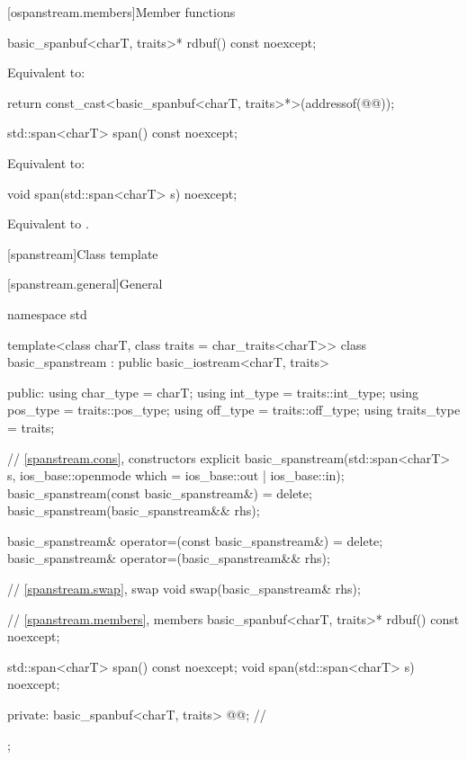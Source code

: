 [ospanstream.members]{Member functions}

%
\begin{itemdecl}
basic_spanbuf<charT, traits>* rdbuf() const noexcept;
\end{itemdecl}

\begin{itemdescr}
\pnum
\effects
Equivalent to:
\begin{codeblock}
return const_cast<basic_spanbuf<charT, traits>*>(addressof(@@));
\end{codeblock}
\end{itemdescr}

%
\begin{itemdecl}
std::span<charT> span() const noexcept;
\end{itemdecl}

\begin{itemdescr}
\pnum
\effects
Equivalent to: 
\end{itemdescr}

%
\begin{itemdecl}
void span(std::span<charT> s) noexcept;
\end{itemdecl}

\begin{itemdescr}
\pnum
\effects
Equivalent to .
\end{itemdescr}

[spanstream]{Class template }

[spanstream.general]{General}

%
\begin{codeblock}
namespace std {
  template<class charT, class traits = char_traits<charT>>
  class basic_spanstream
    : public basic_iostream<charT, traits> {
  public:
    using char_type   = charT;
    using int_type    = traits::int_type;
    using pos_type    = traits::pos_type;
    using off_type    = traits::off_type;
    using traits_type = traits;

    // \ref{spanstream.cons}, constructors
    explicit basic_spanstream(std::span<charT> s,
                              ios_base::openmode which = ios_base::out | ios_base::in);
    basic_spanstream(const basic_spanstream&) = delete;
    basic_spanstream(basic_spanstream&& rhs);

    basic_spanstream& operator=(const basic_spanstream&) = delete;
    basic_spanstream& operator=(basic_spanstream&& rhs);

    // \ref{spanstream.swap}, swap
    void swap(basic_spanstream& rhs);

    // \ref{spanstream.members}, members
    basic_spanbuf<charT, traits>* rdbuf() const noexcept;

    std::span<charT> span() const noexcept;
    void span(std::span<charT> s) noexcept;

  private:
    basic_spanbuf<charT, traits> @@;    // \expos
  };
}
\end{codeblock}

